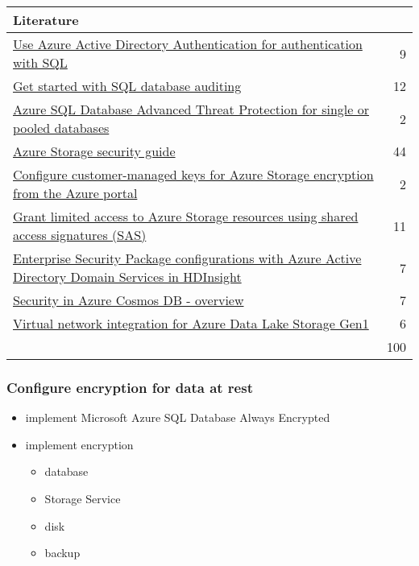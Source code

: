\begin{tabular}{p{14cm} | r}
\textbf{Literature} & \\
\hline
\href{https://docs.microsoft.com/en-us/azure/sql-database/sql-database-aad-authentication}{Use Azure Active Directory Authentication for authentication with SQL} & 9 \\
\href{https://docs.microsoft.com/en-us/azure/sql-database/sql-database-auditing}{Get started with SQL database auditing} & 12 \\
\href{https://docs.microsoft.com/en-us/azure/sql-database/sql-database-threat-detection}{Azure SQL Database Advanced Threat Protection for single or pooled databases} & 2 \\
\href{https://docs.microsoft.com/en-us/azure/storage/common/storage-security-guide}{Azure Storage security guide} & 44 \\
\href{https://docs.microsoft.com/en-us/azure/storage/common/storage-encryption-keys-portal}{Configure customer-managed keys for Azure Storage encryption from the Azure portal} & 2 \\
\href{https://docs.microsoft.com/en-us/azure/storage/common/storage-sas-overview}{Grant limited access to Azure Storage resources using shared access signatures (SAS)} & 11 \\
\href{https://docs.microsoft.com/en-us/azure/hdinsight/domain-joined/apache-domain-joined-configure-using-azure-adds}{Enterprise Security Package configurations with Azure Active Directory Domain Services in HDInsight} & 7 \\
\href{https://docs.microsoft.com/en-us/azure/cosmos-db/database-security}{Security in Azure Cosmos DB - overview} & 7 \\
\href{https://docs.microsoft.com/en-us/azure/data-lake-store/data-lake-store-network-security}{Virtual network integration for Azure Data Lake Storage Gen1} & 6 \\
\cline{2-2} 
 & 100 \\
\end{tabular}

\subsubsection{Configure encryption for data at rest}
\begin{itemize}
\item implement Microsoft Azure SQL Database Always Encrypted
\item implement encryption 
	\begin{itemize}
		\item database
		\item Storage Service
		\item disk
		\item backup
	\end{itemize}
\end{itemize}

